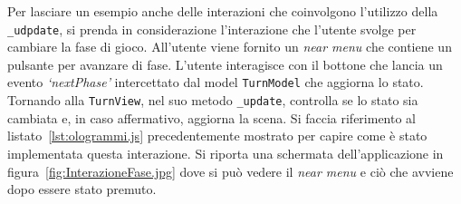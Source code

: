 Per lasciare un esempio anche delle interazioni che coinvolgono l'utilizzo della \texttt{\_udpdate}, si prenda in considerazione l'interazione che l'utente svolge per cambiare la 
fase di gioco. All'utente viene fornito un \textit{near menu} che contiene un pulsante per avanzare di fase. L'utente interagisce con il bottone che lancia un evento 
\textit{`nextPhase'} intercettato dal model \texttt{TurnModel} che aggiorna lo stato. Tornando alla \texttt{TurnView}, nel suo metodo \texttt{\_update}, controlla se lo stato sia
cambiata e, in caso affermativo, aggiorna la scena. Si faccia riferimento al listato~\ref{lst:ologrammi.js} precedentemente mostrato per capire come è stato implementata questa
interazione. Si riporta una schermata dell'applicazione in figura~\ref{fig:InterazioneFase.jpg} dove si può vedere il \textit{near menu} e ciò che avviene dopo essere stato premuto.
